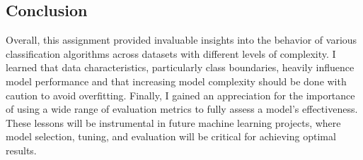 \subsection*{Conclusion}
Overall, this assignment provided invaluable insights into the behavior of various classification algorithms across datasets with different levels of complexity. I learned that data characteristics, particularly class boundaries, heavily influence model performance and that increasing model complexity should be done with caution to avoid overfitting. Finally, I gained an appreciation for the importance of using a wide range of evaluation metrics to fully assess a model's effectiveness. These lessons will be instrumental in future machine learning projects, where model selection, tuning, and evaluation will be critical for achieving optimal results.